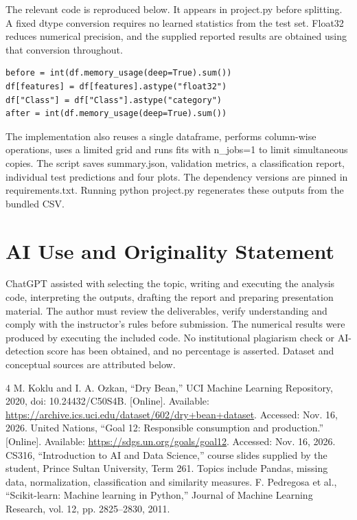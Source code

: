 \documentclass[conference]{IEEEtran}
\begin{document}
The relevant code is reproduced below. It appears in project.py before splitting. A fixed dtype conversion requires no learned statistics from the test set. Float32 reduces numerical precision, and the supplied reported results are obtained using that conversion throughout.
{\footnotesize
\begin{verbatim}
before = int(df.memory_usage(deep=True).sum())
df[features] = df[features].astype("float32")
df["Class"] = df["Class"].astype("category")
after = int(df.memory_usage(deep=True).sum())
\end{verbatim}
}
The implementation also reuses a single dataframe, performs column-wise operations, uses a limited grid and runs fits with n\_jobs=1 to limit simultaneous copies. The script saves summary.json, validation metrics, a classification report, individual test predictions and four plots. The dependency versions are pinned in requirements.txt. Running python project.py regenerates these outputs from the bundled CSV.
\section{AI Use and Originality Statement}
ChatGPT assisted with selecting the topic, writing and executing the analysis code, interpreting the outputs, drafting the report and preparing presentation material. The author must review the deliverables, verify understanding and comply with the instructor's rules before submission. The numerical results were produced by executing the included code. No institutional plagiarism check or AI-detection score has been obtained, and no percentage is asserted. Dataset and conceptual sources are attributed below.
\begin{thebibliography}{4}
 M. Koklu and I. A. Ozkan, ``Dry Bean,'' UCI Machine Learning Repository, 2020, doi: 10.24432/C50S4B. [Online]. Available: \url{https://archive.ics.uci.edu/dataset/602/dry+bean+dataset}. Accessed: Nov. 16, 2026.
 United Nations, ``Goal 12: Responsible consumption and production.'' [Online]. Available: \url{https://sdgs.un.org/goals/goal12}. Accessed: Nov. 16, 2026.
 CS316, ``Introduction to AI and Data Science,'' course slides supplied by the student, Prince Sultan University, Term 261. Topics include Pandas, missing data, normalization, classification and similarity measures.
 F. Pedregosa et al., ``Scikit-learn: Machine learning in Python,'' Journal of Machine Learning Research, vol. 12, pp. 2825--2830, 2011.
\end{thebibliography}
\end{document}
